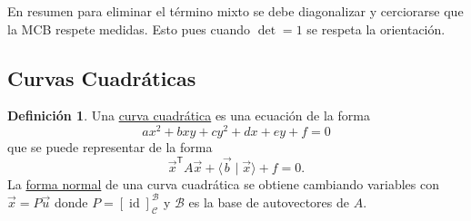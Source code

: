 \documentclass[12pt]{article}
\theoremstyle{plain}
\theoremstyle{definition}
\newtheorem*{Def}{Definición}       %
\theoremstyle{remark}
\DeclareMathOperator{\id}{id}       %
\newcommand{\cB}{\mathcal{B}}       %
\newcommand{\cC}{\mathcal{C}}       %
\newcommand{\sT}{\mathsf{T}}        %
\renewcommand{\:}{\colon}           %
\newcommand{\un}[1]{\underline{#1}}
\renewcommand{\.}{\Cdot}                %
\begin{document}
\begin{multicols}{2}
En resumen para eliminar el término mixto se debe diagonalizar y cerciorarse que la MCB respete medidas. Esto pues cuando $\det=1$ se respeta la orientación.

\subsection*{Curvas Cuadráticas}

\begin{Def} 
Una \un{curva cuadrática} es una ecuación de la forma 
$$ax^2+bxy+cy^2+dx+ey+f=0$$
que se puede representar de la forma 
$$\vec{x}^\sT A\vec{x}+\langle\vec{b}\mid\vec{x}\rangle+f=0.$$
La \un{forma normal} de una curva cuadrática se obtiene cambiando variables con $\vec{x}=P\vec{u}$ donde $P=[\id]^\cB_\cC$ y $\cB$ es la base de autovectores de $A$. 
\end{Def}


\end{multicols}
\end{document}
